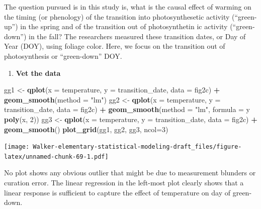 \documentclass[]{book}
\newenvironment{Shaded}{\begin{snugshade}}{\end{snugshade}}
\newcommand{\DataTypeTok}[1]{\textcolor[rgb]{0.13,0.29,0.53}{#1}}
\newcommand{\DecValTok}[1]{\textcolor[rgb]{0.00,0.00,0.81}{#1}}
\newcommand{\KeywordTok}[1]{\textcolor[rgb]{0.13,0.29,0.53}{\textbf{#1}}}
\newcommand{\NormalTok}[1]{#1}
\newcommand{\OperatorTok}[1]{\textcolor[rgb]{0.81,0.36,0.00}{\textbf{#1}}}
\newcommand{\StringTok}[1]{\textcolor[rgb]{0.31,0.60,0.02}{#1}}
\providecommand{\tightlist}{%
  \setlength{\itemsep}{0pt}\setlength{\parskip}{0pt}}
\begin{document}
The question pursued is in this study is, what is the causal effect of warming on the timing (or phenology) of the transition into photosynthesetic activity (``green-up'') in the spring and of the transition out of photosynthetin ic activity (``green-down'') in the fall? The researchers measured these transition dates, or Day of Year (DOY), using foliage color. Here, we focus on the transition out of photosynthesis or ``green-down'' DOY.

\begin{enumerate}
\def\labelenumi{\arabic{enumi}.}
\tightlist
\item
  \textbf{Vet the data}
\end{enumerate}

\begin{Shaded}
\begin{Highlighting}[]
\NormalTok{gg1 <-}\StringTok{ }\KeywordTok{qplot}\NormalTok{(}\DataTypeTok{x =}\NormalTok{ temperature,}
      \DataTypeTok{y =}\NormalTok{ transition_date,}
      \DataTypeTok{data =}\NormalTok{ fig2c) }\OperatorTok{+}
\StringTok{  }\KeywordTok{geom_smooth}\NormalTok{(}\DataTypeTok{method =} \StringTok{"lm"}\NormalTok{)}
\NormalTok{gg2 <-}\StringTok{ }\KeywordTok{qplot}\NormalTok{(}\DataTypeTok{x =}\NormalTok{ temperature,}
      \DataTypeTok{y =}\NormalTok{ transition_date,}
      \DataTypeTok{data =}\NormalTok{ fig2c) }\OperatorTok{+}
\StringTok{  }\KeywordTok{geom_smooth}\NormalTok{(}\DataTypeTok{method =} \StringTok{"lm"}\NormalTok{, }\DataTypeTok{formula =}\NormalTok{ y }\OperatorTok{~}\StringTok{ }\KeywordTok{poly}\NormalTok{(x, }\DecValTok{2}\NormalTok{))}
\NormalTok{gg3 <-}\StringTok{ }\KeywordTok{qplot}\NormalTok{(}\DataTypeTok{x =}\NormalTok{ temperature,}
      \DataTypeTok{y =}\NormalTok{ transition_date,}
      \DataTypeTok{data =}\NormalTok{ fig2c) }\OperatorTok{+}
\StringTok{  }\KeywordTok{geom_smooth}\NormalTok{()}
\KeywordTok{plot_grid}\NormalTok{(gg1, gg2, gg3, }\DataTypeTok{ncol=}\DecValTok{3}\NormalTok{)}
\end{Highlighting}
\end{Shaded}

\texttt{[image: Walker-elementary-statistical-modeling-draft\_files/figure-latex/unnamed-chunk-69-1.pdf]}

No plot shows any obvious outlier that might be due to measurement blunders or curation error. The linear regression in the left-most plot clearly shows that a linear response is sufficient to capture the effect of temperature on day of green-down.
\end{document}
